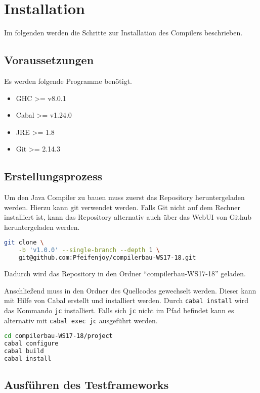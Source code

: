 \chapter{Installation}

Im folgenden werden die Schritte zur Installation des Compilers beschrieben.

\section{Voraussetzungen}

Es werden folgende Programme benötigt.
\begin{itemize}
	\item GHC >= v8.0.1
	\item Cabal >= v1.24.0
	\item JRE >= 1.8
	\item Git >= 2.14.3
\end{itemize}

\section{Erstellungsprozess}

Um den Java Compiler zu bauen muss zuerst das Repository heruntergeladen werden.
Hierzu kann git verwendet werden. Falls Git nicht auf dem Rechner installiert ist,
kann das Repository alternativ auch über das WebUI von Github heruntergeladen werden.

\begin{lstlisting}[language=bash, caption={ Download des Projektes }]
git clone \
	-b 'v1.0.0' --single-branch --depth 1 \
	git@github.com:Pfeifenjoy/compilerbau-WS17-18.git
\end{lstlisting}

Dadurch wird das Repository in den Ordner \enquote{compilerbau-WS17-18} geladen.

Anschließend muss in den Ordner des Quellcodes gewechselt werden.
Dieser kann mit Hilfe von Cabal erstellt und installiert werden.
Durch \lstinline{cabal install} wird das Kommando \lstinline{jc} installiert.
Falls sich \lstinline{jc} nicht im Pfad befindet kann es alternativ mit \lstinline{cabal exec jc}
ausgeführt werden.
\begin{lstlisting}[language=bash, caption={Bauen des jc Kommandos}, label={install-script}]
cd compilerbau-WS17-18/project
cabal configure
cabal build
cabal install
\end{lstlisting}

\section{Ausführen des Testframeworks}


